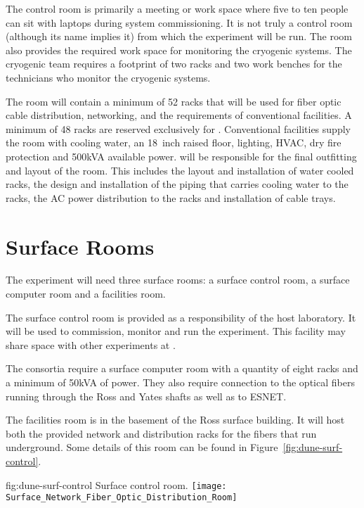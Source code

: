 The control room is primarily a meeting or work space where
five to ten people can sit with laptops during system commissioning.
It is not truly a control room (although its name implies it) from which the
experiment will be run.  The room also provides the required work space for
monitoring the cryogenic systems.  The cryogenic team requires a
footprint of two racks and two work benches for the technicians who monitor the cryogenic systems.
       
The  room will contain a minimum of 52 racks that will be
used for fiber optic cable distribution, networking, 
 and the requirements of conventional facilities.  A
minimum of 48 racks are reserved exclusively for .
Conventional facilities supply the  room with cooling
water, an 18~inch raised floor, lighting, HVAC, dry fire protection
and 500kVA available power.   will be responsible for
the final outfitting and layout of the room.  This includes the layout
and installation of water cooled racks, the design and installation of
the piping that carries cooling water to the racks, the AC power
distribution to the racks and installation of cable trays.


\section{Surface Rooms}
\label{sec:fdsp-coord-surf-rooms}


The  experiment will need three surface rooms: a surface
control room, a  surface computer room and a facilities room.


The  surface control room is provided as a responsibility of the host laboratory.  It will be used to commission, monitor and run the
experiment.  This facility may share space with
other experiments at \surf.

The  consortia require a surface computer room with a
quantity of eight racks and a minimum of 50kVA of power.  They also require connection
to the optical fibers running through the Ross and Yates shafts as
well as to ESNET.


The facilities room is in the basement of the Ross surface
building.  It will host both the \fnal provided network and
distribution racks for the fibers that run underground. Some details
of this room can be found in Figure~\ref{fig:dune-surf-control}.
\begin{dunefigure}{fig:dune-surf-control}
  {Surface control room.}
  \texttt{[image: Surface\_Network\_Fiber\_Optic\_Distribution\_Room]}
\end{dunefigure}


